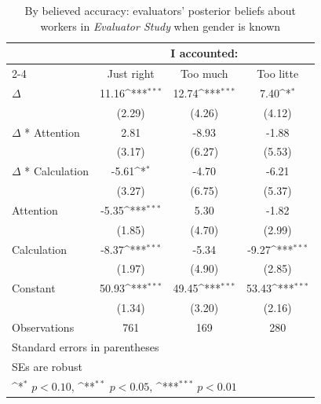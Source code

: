 \begin{table}[htbp]\centering
\def\sym#1{\ifmmode^{#1}\else\(^{#1}\)\fi}
\caption{By believed accuracy: evaluators' posterior beliefs about workers in \textit{Evaluator Study} when gender is known}
\begin{tabular}{l*{3}{c}}
\hline\hline
                &\multicolumn{3}{c}{I accounted:}                        \\\cmidrule(lr){2-4}
                &\multicolumn{1}{c}{Just right}&\multicolumn{1}{c}{Too much}&\multicolumn{1}{c}{Too litte}\\
\hline
$\Delta$        &    11.16\sym{***}&    12.74\sym{***}&     7.40\sym{*}  \\
                &   (2.29)         &   (4.26)         &   (4.12)         \\
$\Delta$ * Attention&     2.81         &    -8.93         &    -1.88         \\
                &   (3.17)         &   (6.27)         &   (5.53)         \\
$\Delta$ * Calculation&    -5.61\sym{*}  &    -4.70         &    -6.21         \\
                &   (3.27)         &   (6.75)         &   (5.37)         \\
Attention       &    -5.35\sym{***}&     5.30         &    -1.82         \\
                &   (1.85)         &   (4.70)         &   (2.99)         \\
Calculation     &    -8.37\sym{***}&    -5.34         &    -9.27\sym{***}\\
                &   (1.97)         &   (4.90)         &   (2.85)         \\
Constant        &    50.93\sym{***}&    49.45\sym{***}&    53.43\sym{***}\\
                &   (1.34)         &   (3.20)         &   (2.16)         \\
\hline
Observations    &      761         &      169         &      280         \\
\hline\hline
\multicolumn{4}{l}{\footnotesize Standard errors in parentheses}\\
\multicolumn{4}{l}{\footnotesize SEs are robust}\\
\multicolumn{4}{l}{\footnotesize \sym{*} \(p<0.10\), \sym{**} \(p<0.05\), \sym{***} \(p<0.01\)}\\
\end{tabular}
\end{table}
